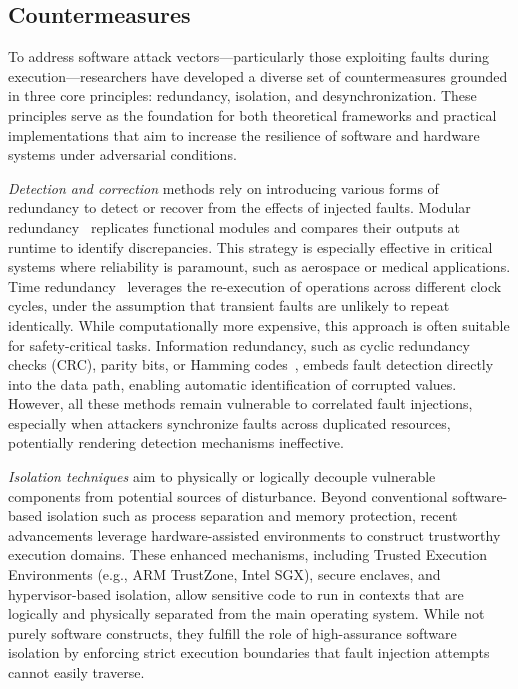 \subsection{Countermeasures}
To address software attack vectors—particularly those exploiting faults during execution—researchers have developed a diverse set of countermeasures grounded in three core principles: redundancy, isolation, and desynchronization. These principles serve as the foundation for both theoretical frameworks and practical implementations that aim to increase the resilience of software and hardware systems under adversarial conditions.

\textit{Detection and correction} methods rely on introducing various forms of redundancy to detect or recover from the effects of injected faults. Modular redundancy~\cite{dutertre2011review} replicates functional modules and compares their outputs at runtime to identify discrepancies. This strategy is especially effective in critical systems where reliability is paramount, such as aerospace or medical applications. Time redundancy~\cite{manssour2022processor} leverages the re-execution of operations across different clock cycles, under the assumption that transient faults are unlikely to repeat identically. While computationally more expensive, this approach is often suitable for safety-critical tasks. Information redundancy, such as cyclic redundancy checks (CRC), parity bits, or Hamming codes~\cite{yuce2016fame}, embeds fault detection directly into the data path, enabling automatic identification of corrupted values. However, all these methods remain vulnerable to correlated fault injections, especially when attackers synchronize faults across duplicated resources, potentially rendering detection mechanisms ineffective.

\textit{Isolation techniques} aim to physically or logically decouple vulnerable components from potential sources of disturbance. Beyond conventional software-based isolation such as process separation and memory protection, recent advancements leverage hardware-assisted environments to construct trustworthy execution domains. These enhanced mechanisms, including Trusted Execution Environments (e.g., ARM TrustZone\cite{pinto2019demystifying}, Intel SGX\cite{mckeen2016intel}), secure enclaves\cite{beekman2016improving}, and hypervisor-based isolation\cite{hua2012barrier}, allow sensitive code to run in contexts that are logically and physically separated from the main operating system. While not purely software constructs, they fulfill the role of high-assurance software isolation by enforcing strict execution boundaries that fault injection attempts cannot easily traverse.

